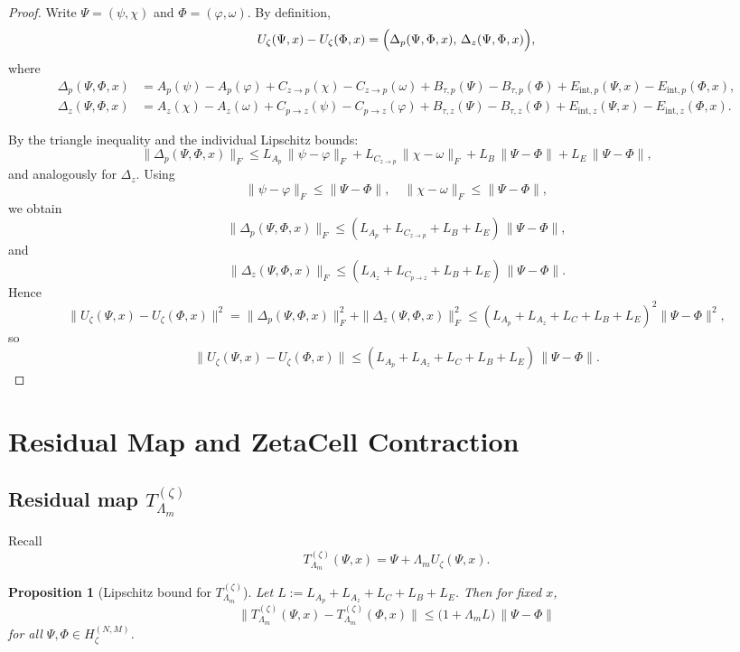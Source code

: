 \documentclass[11pt]{article}
\theoremstyle{definition}
\theoremstyle{plain}
\newtheorem{proposition}{Proposition}
\begin{document}
\begin{proof}
Write $\Psi=(\psi,\chi)$ and $\Phi=(\varphi,\omega)$.
By definition,
\[
  U_\zeta(\Psi,x) - U_\zeta(\Phi,x)
  =
  \Bigl(
    \Delta_p(\Psi,\Phi,x),
    \,
    \Delta_z(\Psi,\Phi,x)
  \Bigr),
\]
where
\begin{align*}
  \Delta_p(\Psi,\Phi,x)
  &= A_p(\psi)-A_p(\varphi)
   + C_{z\to p}(\chi)-C_{z\to p}(\omega)
   + B_{\tau,p}(\Psi)-B_{\tau,p}(\Phi)
   + E_{\mathrm{int},p}(\Psi,x)-E_{\mathrm{int},p}(\Phi,x),\\
  \Delta_z(\Psi,\Phi,x)
  &= A_z(\chi)-A_z(\omega)
   + C_{p\to z}(\psi)-C_{p\to z}(\varphi)
   + B_{\tau,z}(\Psi)-B_{\tau,z}(\Phi)
   + E_{\mathrm{int},z}(\Psi,x)-E_{\mathrm{int},z}(\Phi,x).
\end{align*}

By the triangle inequality and the individual Lipschitz bounds:
\[
  \|\Delta_p(\Psi,\Phi,x)\|_F
  \le
  L_{A_p}\,\|\psi-\varphi\|_F
  + L_{C_{z\to p}}\,\|\chi-\omega\|_F
  + L_B\,\|\Psi-\Phi\|
  + L_E\,\|\Psi-\Phi\|,
\]
and analogously for $\Delta_z$.
Using
\[
  \|\psi-\varphi\|_F\le\|\Psi-\Phi\|,
  \quad
  \|\chi-\omega\|_F\le\|\Psi-\Phi\|,
\]
we obtain
\[
  \|\Delta_p(\Psi,\Phi,x)\|_F
  \le
  (L_{A_p}+L_{C_{z\to p}}+L_B+L_E)\,\|\Psi-\Phi\|,
\]
and
\[
  \|\Delta_z(\Psi,\Phi,x)\|_F
  \le
  (L_{A_z}+L_{C_{p\to z}}+L_B+L_E)\,\|\Psi-\Phi\|.
\]
Hence
\[
  \|U_\zeta(\Psi,x) - U_\zeta(\Phi,x)\|^2
  = \|\Delta_p(\Psi,\Phi,x)\|_F^2 + \|\Delta_z(\Psi,\Phi,x)\|_F^2
  \le
  (L_{A_p}+L_{A_z}+L_C+L_B+L_E)^2 \|\Psi-\Phi\|^2,
\]
so
\[
  \|U_\zeta(\Psi,x) - U_\zeta(\Phi,x)\|
  \le
  (L_{A_p}+L_{A_z}+L_C+L_B+L_E)\,\|\Psi-\Phi\|.
\]
\end{proof}

\section{Residual Map and ZetaCell Contraction}

\subsection{Residual map \texorpdfstring{$T_{\Lambda_m}^{(\zeta)}$}{TLambdaz}}

Recall
\[
  T_{\Lambda_m}^{(\zeta)}(\Psi,x)
  = \Psi + \Lambda_m U_\zeta(\Psi,x).
\]

\begin{proposition}[Lipschitz bound for $T_{\Lambda_m}^{(\zeta)}$]\label{prop:L_Tzeta}
Let $L:=L_{A_p}+L_{A_z}+L_C+L_B+L_E$.
Then for fixed $x$,
\[
  \|T_{\Lambda_m}^{(\zeta)}(\Psi,x) - T_{\Lambda_m}^{(\zeta)}(\Phi,x)\|
  \le
  \bigl(1 + \Lambda_m L\bigr)\,\|\Psi-\Phi\|
\]
for all $\Psi,\Phi\in H_\zeta^{(N,M)}$.
\end{proposition}
\end{document}
